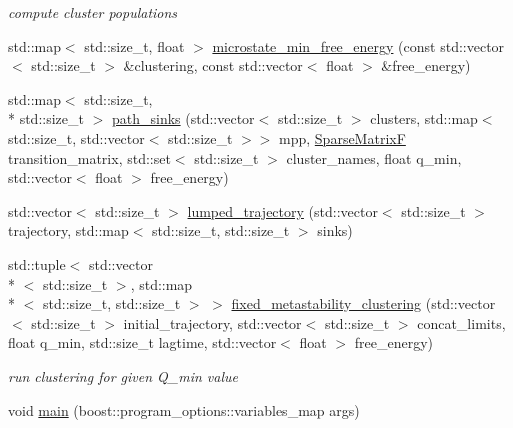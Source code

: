 \begin{DoxyCompactItemize}
\begin{DoxyCompactList}\small\item\em compute cluster populations \end{DoxyCompactList}\item 
std\-::map$<$ std\-::size\-\_\-t, float $>$ \hyperlink{namespaceClustering_1_1MPP_a59c6293dca29ab7578334ba9c74b8ea1}{microstate\-\_\-min\-\_\-free\-\_\-energy} (const std\-::vector$<$ std\-::size\-\_\-t $>$ \&clustering, const std\-::vector$<$ float $>$ \&free\-\_\-energy)
\item 
std\-::map$<$ std\-::size\-\_\-t, \\*
std\-::size\-\_\-t $>$ \hyperlink{namespaceClustering_1_1MPP_ad62b2497eadb5bb6e66f7f500b8c372a}{path\-\_\-sinks} (std\-::vector$<$ std\-::size\-\_\-t $>$ clusters, std\-::map$<$ std\-::size\-\_\-t, std\-::vector$<$ std\-::size\-\_\-t $>$$>$ mpp, \hyperlink{namespaceClustering_1_1MPP_aab655de2feb4b56dd87bcc0fc6f13974}{Sparse\-Matrix\-F} transition\-\_\-matrix, std\-::set$<$ std\-::size\-\_\-t $>$ cluster\-\_\-names, float q\-\_\-min, std\-::vector$<$ float $>$ free\-\_\-energy)
\item 
std\-::vector$<$ std\-::size\-\_\-t $>$ \hyperlink{namespaceClustering_1_1MPP_afc4d7a9ced9fd7372555b1cdec9c3bc2}{lumped\-\_\-trajectory} (std\-::vector$<$ std\-::size\-\_\-t $>$ trajectory, std\-::map$<$ std\-::size\-\_\-t, std\-::size\-\_\-t $>$ sinks)
\item 
\hypertarget{namespaceClustering_1_1MPP_a57e887b44d8a2665d2f1fc93a2662af3}{std\-::tuple$<$ std\-::vector\\*
$<$ std\-::size\-\_\-t $>$, std\-::map\\*
$<$ std\-::size\-\_\-t, std\-::size\-\_\-t $>$ $>$ \hyperlink{namespaceClustering_1_1MPP_a57e887b44d8a2665d2f1fc93a2662af3}{fixed\-\_\-metastability\-\_\-clustering} (std\-::vector$<$ std\-::size\-\_\-t $>$ initial\-\_\-trajectory, std\-::vector$<$ std\-::size\-\_\-t $>$ concat\-\_\-limits, float q\-\_\-min, std\-::size\-\_\-t lagtime, std\-::vector$<$ float $>$ free\-\_\-energy)}\label{namespaceClustering_1_1MPP_a57e887b44d8a2665d2f1fc93a2662af3}

\begin{DoxyCompactList}\small\item\em run clustering for given Q\-\_\-min value \end{DoxyCompactList}\item 
void \hyperlink{namespaceClustering_1_1MPP_aee5ffda122e11568a073e97e4a316d89}{main} (boost\-::program\-\_\-options\-::variables\-\_\-map args)
\end{DoxyCompactItemize}


